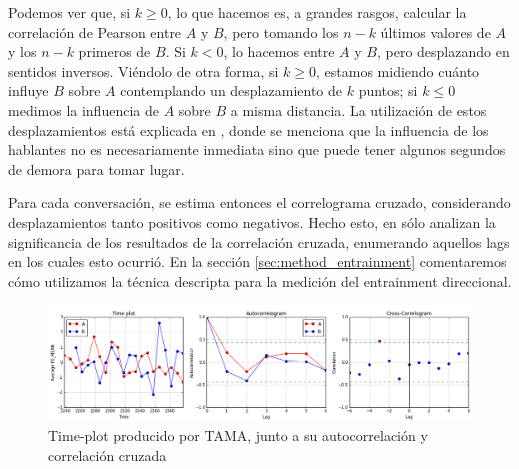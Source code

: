 Podemos ver que, si $k \geq 0$, lo que hacemos es, a grandes rasgos, calcular la correlación de Pearson entre $A$ y $B$, pero tomando los $n-k$ últimos valores de $A$ y los $n-k$ primeros de $B$. Si $k < 0$, lo hacemos entre $A$ y $B$, pero desplazando en sentidos inversos. Viéndolo de otra forma, si $k \geq 0$, estamos midiendo cuánto influye $B$ sobre $A$ contemplando un desplazamiento de $k$ puntos; si $k \leq 0$ medimos la influencia de $A$ sobre $B$ a misma distancia. La utilización de estos desplazamientos está explicada en \cite{gravano2015backward}, donde se menciona que la influencia de los hablantes no es necesariamente inmediata sino que puede tener algunos segundos de demora para tomar lugar.


Para cada conversación, se estima entonces el correlograma cruzado, considerando desplazamientos tanto positivos como negativos. Hecho esto, en \cite{KOU2008.2} sólo analizan la significancia de los resultados de la correlación cruzada, enumerando aquellos lags en los cuales esto ocurrió. En la sección \ref{sec:method_entrainment} comentaremos cómo utilizamos la técnica descripta para la medición del entrainment direccional.

\begin{figure}
\centering
\includegraphics[width=\textwidth]{images/time_plot_with_cross_correlation.png}
\caption{Time-plot producido por TAMA, junto a su autocorrelación y correlación cruzada}
\end{figure}
